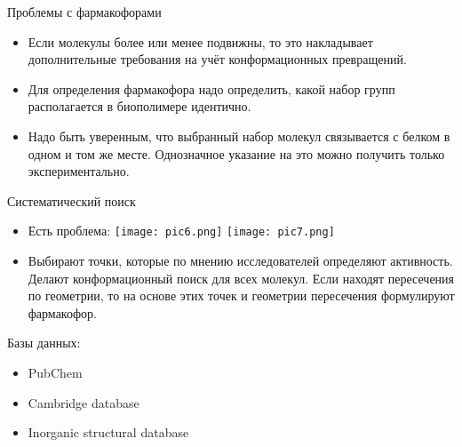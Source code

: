 \begin{frame}[plain]
\end{frame}

\begin{frame}{Проблемы с фармакофорами}
	\begin{itemize}

\item Если молекулы более или менее подвижны, то это накладывает дополнительные требования на учёт конформационных превращений.
\item	 Для определения фармакофора надо определить, какой набор групп располагается в биополимере идентично.
\item	  Надо быть уверенным, что выбранный набор молекул  связывается с белком в одном и том же месте. Однозначное указание на это можно получить только экспериментально.
	\end{itemize}
\end{frame}

\begin{frame}{Систематический поиск}
	\begin{itemize}
		\item  Есть проблема: \newline
					\texttt{[image: pic6.png]}
					\texttt{[image: pic7.png]}
		\item	Выбирают точки, которые по мнению исследователей определяют активность. Делают конформационный поиск для всех молекул. Если находят пересечения по геометрии, то на основе этих точек и геометрии пересечения формулируют фармакофор.
			\end{itemize}
		\end{frame}

\begin{frame}{Базы данных:}{}
 \begin{itemize}
  \item
  PubChem
\vspace{0.2cm}
  \item
  Cambridge database
\vspace{0.2cm}
  \item
   Inorganic structural database  
   \vspace{0.2cm}
 \end{itemize}
			  \setlength{\fboxsep}{0pt}



\end{frame}
	

